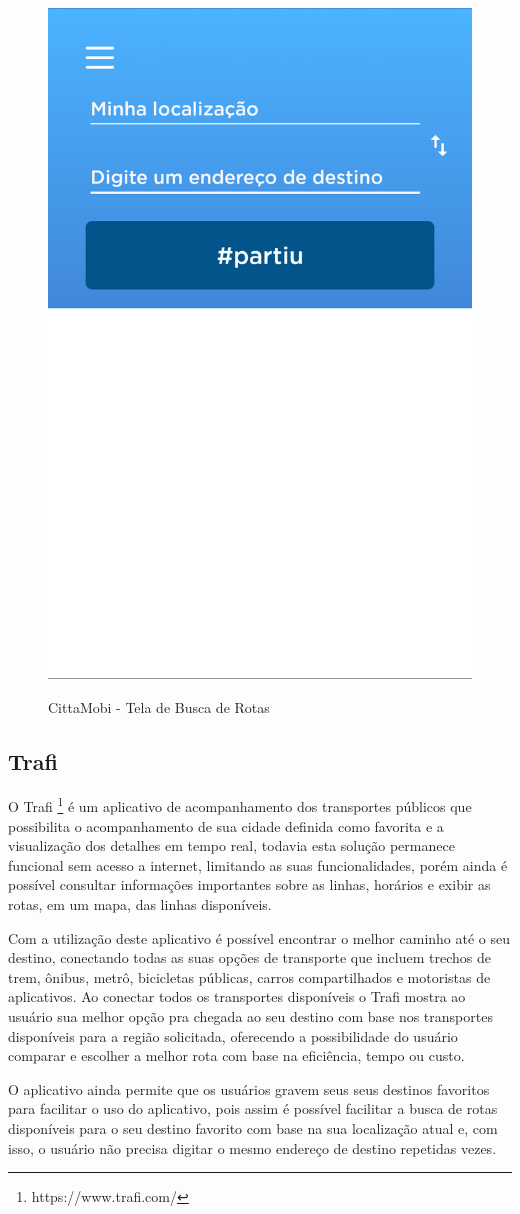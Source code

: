\begin{figure}[H]
\caption{CittaMobi - Tela de Busca de Rotas}
\centering
\includegraphics[width=.4\textwidth]{imagens/citta-mobi.png}
\label{fig:cittamobi}
\end{figure}

\subsection{Trafi}

O Trafi \footnote{https://www.trafi.com/} é um aplicativo de acompanhamento dos transportes públicos que possibilita o acompanhamento de sua cidade definida como favorita e a visualização dos detalhes em tempo real, todavia esta solução permanece funcional sem acesso a internet, limitando as suas funcionalidades, porém ainda é possível consultar informações importantes sobre as linhas, horários e exibir as rotas, em um mapa, das linhas disponíveis.

Com a utilização deste aplicativo é possível encontrar o melhor caminho até o seu destino, conectando todas as suas opções de transporte que incluem trechos de trem, ônibus, metrô, bicicletas públicas, carros compartilhados e motoristas de aplicativos. Ao conectar todos os transportes disponíveis o Trafi mostra ao usuário sua melhor opção pra chegada ao seu destino com base nos transportes disponíveis para a região solicitada, oferecendo a possibilidade do usuário comparar e escolher a melhor rota com base na eficiência, tempo ou custo.

O aplicativo ainda permite que os usuários gravem seus seus destinos favoritos para facilitar o uso do aplicativo, pois assim é possível facilitar a busca de rotas disponíveis para o seu destino favorito com base na sua localização atual e, com isso, o usuário não precisa digitar o mesmo endereço de destino repetidas vezes.


